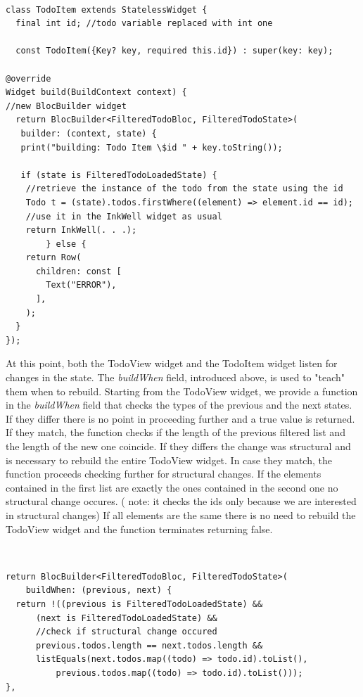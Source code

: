 \begin{code}
\mbox{}\\
 \mbox{}
\label{code:2.14}
\begin{verbatim}
class TodoItem extends StatelessWidget {
  final int id; //todo variable replaced with int one

  const TodoItem({Key? key, required this.id}) : super(key: key);

@override
Widget build(BuildContext context) {
//new BlocBuilder widget
  return BlocBuilder<FilteredTodoBloc, FilteredTodoState>(
   builder: (context, state) {
   print("building: Todo Item \$id " + key.toString());

   if (state is FilteredTodoLoadedState) {
    //retrieve the instance of the todo from the state using the id
    Todo t = (state).todos.firstWhere((element) => element.id == id);
    //use it in the InkWell widget as usual
    return InkWell(. . .);
        } else {
    return Row(
      children: const [
        Text("ERROR"),
      ],
    );
  }
});
\end{verbatim}
\mbox{}
\end{code}

At this point, both the TodoView widget and the TodoItem widget listen for changes in the state. The \textit{buildWhen} field, introduced above,  is used to "teach" them when to rebuild. Starting from the TodoView widget, we provide a function in the \textit{buildWhen} field that checks the types of the previous and the next states. If they differ there is no point in proceeding further and a true value is returned. If they match, the function checks if the length of the previous filtered list and the length of the new one coincide. If they differs the change was structural and is necessary to rebuild the entire TodoView widget. In case they match, the function proceeds checking further for structural changes. If the elements contained in the first list are exactly the ones contained in the second one no structural change occures. ( note: it checks the ids only because we are interested in structural changes) If all elements are the same there is no need to rebuild the TodoView widget and the function terminates returning false.
\begin{code}
\mbox{}\\
 \mbox{}
\label{code:2.14}
\begin{verbatim}
return BlocBuilder<FilteredTodoBloc, FilteredTodoState>(
    buildWhen: (previous, next) {
  return !((previous is FilteredTodoLoadedState) &&
      (next is FilteredTodoLoadedState) &&
      //check if structural change occured
      previous.todos.length == next.todos.length &&
      listEquals(next.todos.map((todo) => todo.id).toList(),
          previous.todos.map((todo) => todo.id).toList()));
},
\end{verbatim}
\mbox{}
\end{code}

